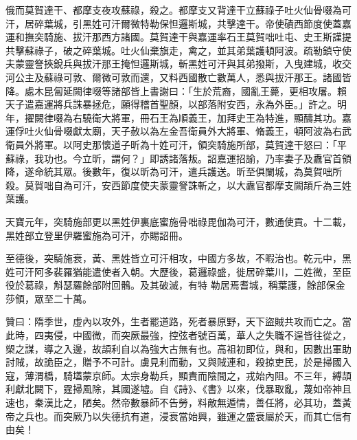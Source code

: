 \begin{pinyinscope}
 俄而莫賀達干、都摩支夜攻蘇祿，殺之。都摩支又背達干立蘇祿子吐火仙骨啜為可汗，居碎葉城，引黑姓可汗爾微特勒保怛邏斯城，共擊達干。帝使磧西節度使蓋嘉運和撫突騎施、拔汗那西方諸國。莫賀達干與嘉運率石王莫賀咄吐屯、史王斯謹提共擊蘇祿子，破之碎葉城。吐火仙棄旗走，禽之，並其弟葉護頓阿波。疏勒鎮守使夫蒙靈詧挾銳兵與拔汗那王掩怛邏斯城，斬黑姓可汗與其弟撥斯，入曳建城，收交河公主及蘇祿可敦、爾微可敦而還，又料西國散亡數萬人，悉與拔汗那王。諸國皆降。處木昆匐延闕律啜等諸部皆上書謝曰：「生於荒裔，國亂王薨，更相攻屠。賴天子遣嘉運將兵誅暴拯危，願得稽首聖顏，以部落附安西，永為外臣。」許之。明年，擢闕律啜為右驍衛大將軍，冊石王為順義王，加拜史王為特進，顯醻其功。嘉運俘吐火仙骨啜獻太廟，天子赦以為左金吾衛員外大將軍、脩義王，頓阿波為右武衛員外將軍。以阿史那懷道子昕為十姓可汗，領突騎施所部，莫賀達干怒曰：「平蘇祿，我功也。今立昕，謂何？」即誘諸落叛。詔嘉運招諭，乃率妻子及纛官首領降，遂命統其眾。後數年，復以昕為可汗，遣兵護送。昕至俱闌城，為莫賀咄所殺。莫賀咄自為可汗，安西節度使夫蒙靈詧誅斬之，以大纛官都摩支闕頡斤為三姓葉護。



 天寶元年，突騎施部更以黑姓伊裏底蜜施骨咄祿毘伽為可汗，數通使貢。十二載，黑姓部立登里伊羅蜜施為可汗，亦賜詔冊。


至德後，突騎施衰，黃、黑姓皆立可汗相攻，中國方多故，不暇治也。乾元中，黑姓可汗阿多裴羅猶能遣使者入朝。大歷後，葛邏祿盛，徙居碎葉川，二姓微，至臣役於葛祿，斛瑟羅餘部附回鶻。及其破滅，有特
 勒居焉耆城，稱葉護，餘部保金莎領，眾至二十萬。



 贊曰：隋季世，虛內以攻外，生者罷道路，死者暴原野，天下盜賊共攻而亡之。當此時，四夷侵，中國微，而突厥最強，控弦者號百萬，華人之失職不逞皆往從之，槊之謀，導之入邊，故頡利自以為強大古無有也。高祖初即位，與和，因數出軍助討賊，故詭臣之，贈予不可計。虜見利而動，又與賊連和，殺掠吏民，於是掃國入寇，薄渭橋，騎壒蒙京師。太宗身勒兵，顯責而陰間之，戎始內阻。不三年，縛頡利獻北闕下，霆掃風除，其國遂墟。自《詩》、《書》以來，伐暴取亂，蔑如帝神且速也，秦漢比之，陋矣。然帝數暴師不告勞，料敵無遁情，善任將，必其功，蓋黃帝之兵也。而突厥乃以失德抗有道，浸衰當始興，雖運之盛衰屬於天，而其亡信有由矣！



\end{pinyinscope}